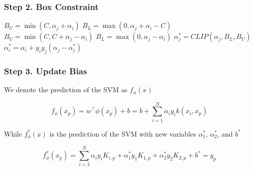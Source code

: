 \documentclass[xcolor=pdftex,dvipsnames,table,handout]{beamer}
\begin{document}
\begin{frame}  
\frametitle{Step 2. Box Constraint}

\begin{algorithmic}
    \State $B_U = \min(C, \alpha_j + \alpha_i)$
    \State $B_L = \max(0, \alpha_j + \alpha_i - C)$
\Else
    \State $B_U = \min(C, C + \alpha_j - \alpha_i)$
    \State $B_L = \max(0, \alpha_j - \alpha_i)$
\EndIf 
\State $\alpha_j^* = CLIP(\alpha_j, B_L, B_U)$
\State $\alpha_i^* = \alpha_i + y_i y_j(\alpha_j - \alpha_j^*)$
\end{algorithmic}

\end{frame}

\begin{frame}  
\frametitle{Step 3. Update Bias}

We denote the prediction of the SVM as $f_{\phi}(x)$

$$
f_{\phi}(x_p) = w^{\top} \phi(x_p) + b = b + \sum_{i=1}^N \alpha_i y_i k(x_i, x_p)
$$

While $f_{\phi}^*(x)$ is the prediction of the SVM with new variables $\alpha_1^*$, $\alpha_2^*$, and $b^*$

$$
f_{\phi}^*(x_p) = \sum_{i=3}^N \alpha_i y_i K_{i, p} + \alpha_1^* y_1 K_{1, p} + \alpha_2^* y_2 K_{2, p} + b^* = y_p
$$
\end{frame}
\end{document}
